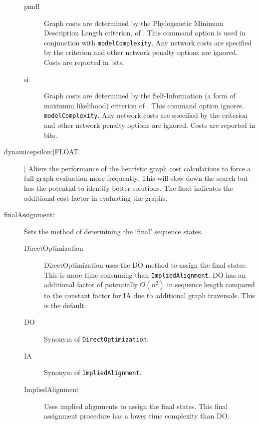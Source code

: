 \begin{description}
\begin{description}
			\item[pmdl] Graph costs are determined by the Phylogenetic Minimum Description Length criterion, 
			of \citep{WheelerandVaron2025}.  This command option is used in conjunction with 
			\texttt{modelComplexity}. Any network costs are specified by the criterion and other network
			penalty options are ignored.  Costs are reported in bits.
			
			\item[si] Graph costs are determined by the Self-Information (a form of maximum likelihood) criterion
			of \citep{WheelerandVaron2025}.  This command option ignores. 
			\texttt{modelComplexity}. Any network costs are specified by the criterion and other network
			penalty options are ignored.  Costs are reported in bits.
			
			
		\end{description}
			

		\item[dynamicepsilon:[FLOAT]] Alters the performance of the heuristic graph cost 
		calculations to force a full graph evaluation more frequently. This will slow down the
		search but has the potential to identify better solutions. The float indicates the additional 
		cost factor in evaluating the graphs.
			
		\item[finalAssignment:] Sets the method of determining the `final' sequence states. 
						
		\begin{description}
			
			\item[DirectOptimization] DirectOptimization uses the DO method to assign 
			the final states. This is more time consuming than \texttt{ImpliedAlignment}. 
			DO has an additional factor of potentially $O(n^2)$ in sequence length compared 
			to the constant factor for IA due to additional graph traversals. This is the default.

			\item[DO] Synonym of \texttt{DirectOptimization}.
			
			\item[IA] Synonym of \texttt{ImpliedAlignment}.
			
			\item[ImpliedAlignment] Uses implied alignments to assign the final states. This 
			final assignment procedure has a lower time complexity than DO.
			

\end{description}
\end{description}
